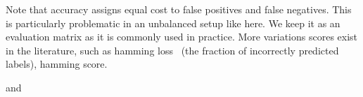 Note that accuracy assigns equal cost to false positives and false negatives. This is particularly problematic in an unbalanced setup like here. We keep it as an evaluation matrix as it is commonly used in practice. More variations scores exist in the literature, such as hamming loss~\cite{hammingLoss} (the fraction of incorrectly predicted labels), hamming score.




 \cite{lossComp}

 \cite{MLTSVM} and \cite{MLTSVMThreeway}



